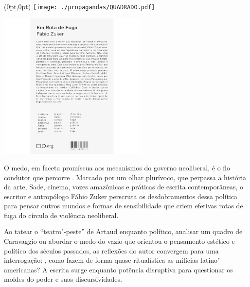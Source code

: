 \pagestyle{quadrado}
\label{quadrado}

\begin{textblock*}{5.625in}(0pt,0pt)%
\vspace*{-3.5cm}
\hspace*{-2.77cm}\texttt{[image: ./propagandas/QUADRADO.pdf]}
\end{textblock*}

\pagebreak %

\begin{center}
\hspace*{.5cm}\includegraphics[width=74mm]{./grid/zuker.jpg}
\end{center}

\hspace*{-7cm}\hrulefill\hspace*{-7cm}

\medskip

\noindent{}O medo, em faceta promíscua aos mecanismos do governo neoliberal, é o fio condutor que percorre {}. Marcado por um olhar plurívoco, que perpassa a história da arte, Sade, cinema, vozes amazônicas e práticas de escrita contemporâneas, o escritor e antropólogo Fábio Zuker perscruta os desdobramentos dessa política para pensar outros mundos e formas de sensibilidade que criem efetivas rotas de fuga do círculo de violência neoliberal.

Ao tatear o “teatro"-peste” de Artaud enquanto político, analisar um quadro de Caravaggio ou abordar o medo do vazio que orientou o pensamento estético e político dos séculos passados, as reflexões do autor convergem para uma interrogação: , como fazem de forma quase ritualística as milícias latino"-americanas? A escrita surge enquanto potência disruptiva para questionar os moldes do poder e suas discursividades.

